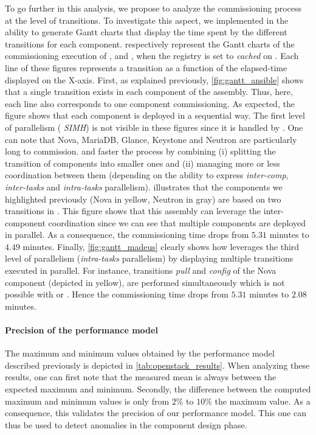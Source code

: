 To go further in this analysis, we propose to analyze the commissioning process
at the level of transitions. To investigate this aspect, we implemented in \mad
the ability to generate Gantt charts that display the time spent by the
different transitions for each component.
respectively represent the Gantt charts of the commissioning execution
of \ansass, \aeoass and \madass, when the registry is set to
\emph{cached} on \ecotype. Each line of these figures represents a
transition as a function of the elapsed-time displayed on the X-axis.
First, as explained previously, \cref{fig:gantt_ansible} shows that a
single transition exists in each component of the \ansass
assembly. Thus, here, each line also corresponds to one component
commissioning. As expected, the figure shows that each component is
deployed in a sequential way. The first level of parallelism (\ie
\emph{SIMH}) is not visible in these figures since it is handled by
\ansible. One can note that Nova, MariaDB, Glance, Keystone and
Neutron are particularly long to commission. \aeoass and \madass
faster the process by combining (i) splitting the transition of
components into smaller ones and (ii) managing more or less
coordination between them (depending on the ability to express
\emph{inter-comp}, \emph{inter-tasks} and \emph{intra-tasks}
parallelism).
%
 illustrates that the components we highlighted
previously (\eg Nova in yellow, Neutron in gray) are based on two transitions in
\aeoass. This figure shows that this assembly can leverage the
inter-component coordination since we can see that multiple components are
deployed in parallel. As a consequence, the commissioning time drops from $5.31$
minutes to $4.49$ minutes.
%
Finally, \cref{fig:gantt_madeus} clearly shows how \mad leverages the third
level of parallelism (\ie \emph{intra-tasks} parallelism) by displaying multiple
transitions executed in parallel. For instance, transitions \emph{pull} and
\emph{config} of the Nova component (depicted in yellow), are performed
simultaneously which is not possible with \ansible or \aeolus. Hence the
commissioning time drops from $5.31$ minutes to $2.08$ minutes.
%

\paragraph{Precision of the performance model}
The maximum and minimum values obtained by the performance model described
previously is depicted in \cref{tab:openstack_results}. When analyzing these
results, one can first note that the measured mean is always between the
expected maximum and minimum. Secondly, the difference between the computed
maximum and minimum values is only from $2\%$ to $10\%$ the maximum value. As a
consequence, this validates the precision of our performance model.
This one can thus be used to detect anomalies in the component design
phase.

